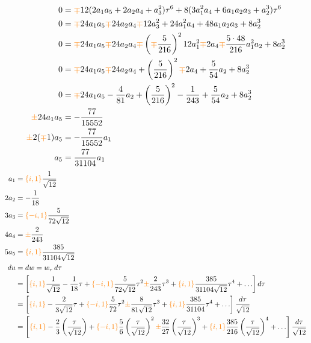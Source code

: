 \documentclass{article}
\begin{document}
\begin{align*}
0 & = \textcolor{orange}{\mp}12(2 a_1 a_5 + 2 a_2 a_4 + a_3^2) \tau^6 + 8(3 a_1^2 a_4 + 6 a_1 a_2 a_3 + a_2^3) \tau^6 \\
0 & = \textcolor{orange}{\mp}24 a_1 a_5 \textcolor{orange}{\mp} 24 a_2 a_4 \textcolor{orange}{\mp} 12 a_3^2 + 24 a_1^2 a_4 + 48 a_1 a_2 a_3 + 8 a_2^3\\
0 & = \textcolor{orange}{\mp}24 a_1 a_5 \textcolor{orange}{\mp} 24 a_2 a_4 \textcolor{orange}{\mp} \left(\textcolor{orange}{\mp} \frac{5}{216}\right)^2 12 a_1^2 \textcolor{orange}{\mp} 2 a_4 \textcolor{orange}{\mp} \frac{5 \cdot 48}{216} a_1^2 a_2 + 8 a_2^3 \\
0 & = \textcolor{orange}{\mp}24 a_1 a_5 \textcolor{orange}{\mp} 24 a_2 a_4 + \left(\frac{5}{216}\right)^2 \textcolor{orange}{\mp} 2 a_4 + \frac{5}{54} a_2 + 8 a_2^3 \\
0 & = \textcolor{orange}{\mp}24 a_1 a_5 - \frac{4}{81} a_2 + \left(\frac{5}{216}\right)^2 - \frac{1}{243} + \frac{5}{54} a_2 + 8 a_2^3 \\
\textcolor{orange}{\pm}24 a_1 a_5 & = -\frac{77}{15552} \\
\textcolor{orange}{\pm}2 (\textcolor{orange}{\mp}1) a_5 & = -\frac{77}{15552} a_1 \\
a_5 & = \frac{77}{31104} a_1
\end{align*}
\begin{align*}
a_1 & = \textcolor{orange}{\{i, 1\}}\frac{1}{\sqrt{12}} \\
2 a_2 & = -\frac{1}{18} \\
3 a_3 & = \textcolor{orange}{\{-i, 1\}}\frac{5}{72\sqrt{12}} \\
4 a_4 & = \textcolor{orange}{\pm}\frac{2}{243} \\
5 a_5 & = \textcolor{orange}{\{i, 1\}}\frac{385}{31104\sqrt{12}} \\
du & = dw = w_\tau\,d\tau \\
& = \left[ \textcolor{orange}{\{i, 1\}}\frac{1}{\sqrt{12}} - \frac{1}{18} \tau + \textcolor{orange}{\{-i, 1\}}\frac{5}{72\sqrt{12}} \tau^2 \textcolor{orange}{\pm} \frac{2}{243} \tau^3 + \textcolor{orange}{\{i, 1\}}\frac{385}{31104\sqrt{12}} \tau^4 + \ldots \right] d\tau \\
& = \left[ \textcolor{orange}{\{i, 1\}} - \frac{2}{3\sqrt{12}} \tau + \textcolor{orange}{\{-i, 1\}}\frac{5}{72} \tau^2 \textcolor{orange}{\pm} \frac{8}{81\sqrt{12}} \tau^3 + \textcolor{orange}{\{i, 1\}}\frac{385}{31104} \tau^4 + \ldots \right] \frac{d\tau}{\sqrt{12}} \\
& = \left[ \textcolor{orange}{\{i, 1\}} - \frac{2}{3} \left(\frac{\tau}{\sqrt{12}}\right) + \textcolor{orange}{\{-i, 1\}}\frac{5}{6} \left(\frac{\tau}{\sqrt{12}}\right)^2 \textcolor{orange}{\pm} \frac{32}{27} \left(\frac{\tau}{\sqrt{12}}\right)^3 + \textcolor{orange}{\{i, 1\}}\frac{385}{216} \left(\frac{\tau}{\sqrt{12}}\right)^4 + \ldots \right] \frac{d\tau}{\sqrt{12}}
\end{align*}
\color{black}
\end{document}
